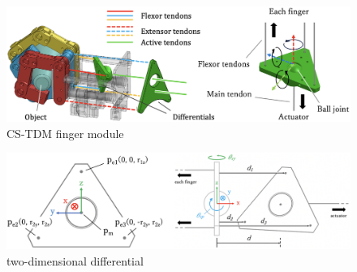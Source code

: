 \documentclass{jarticle}
\begin{document}
\begin{figure}[tb]
  \vspace{-2mm}
  \centering
  \includegraphics[width=0.8\columnwidth]{figs/differential.eps}
  \caption{CS-TDM finger module}
  \label{fig:differential}
\end{figure}
\begin{figure}[tb]
  \vspace{-2mm}
  \centering
  \includegraphics[width=0.8\columnwidth]{figs/diff_2.eps}
  \caption{two-dimensional differential}
  \label{fig:diff_2}
  \vspace{-2mm}
\end{figure}
\end{document}
